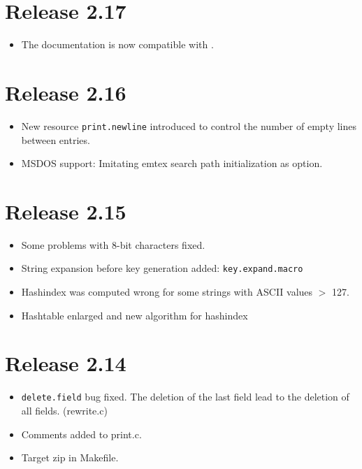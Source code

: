 \documentclass[11pt,a4paper]{scrartcl}
\newcommand\rsc[1]{\texttt{#1}}
\newcommand\File[1]{\textsf{#1}}
\newenvironment{Release}[2]{%
  \def\tmp{#2}%
  \section*{Release #1 \ifx\tmp\empty\else{\normalsize[#2]}\fi}
  \begin{itemize}
}{\end{itemize}}
\newenvironment{Fix}[1]{\item }{}
\newenvironment{New}[1]{\item }{}
\newenvironment{Doc}[1]{\item }{}
\newenvironment{Update}[1]{\item }{}
\begin{document}
\begin{multicols}
 \begin{Release}{2.17}{}
  \begin{Doc}{gene}
    The documentation is now compatible with \LaTeXe.
  \end{Doc}
 \end{Release}

 \begin{Release}{2.16}{}
  \begin{New}{gene}
    New resource \rsc{print.newline} introduced to control the
    number of empty lines between entries.
  \end{New}
  \begin{New}{gene}
    MSDOS support: Imitating emtex search path initialization as
    option.
  \end{New}
 \end{Release}

 \begin{Release}{2.15}{}
  \begin{Fix}{gene}
    Some problems with 8-bit characters fixed.
  \end{Fix}
  \begin{New}{gene}
    String expansion before key generation added:
    \rsc{key.expand.macro}
  \end{New}
  \begin{Fix}{gene}
    Hashindex was computed wrong for some strings with ASCII values $>$
    127.
  \end{Fix}
  \begin{Update}{gene}
    Hashtable enlarged and new algorithm for hashindex
  \end{Update}
 \end{Release}

 \begin{Release}{2.14}{}
  \begin{Fix}{gene}
    \rsc{delete.field} bug fixed. The deletion of the last
    field lead to the deletion of all fields. (\File{rewrite.c})
  \end{Fix}
  \begin{Update}{gene}
    Comments added to \File{print.c}.
  \end{Update}
  \begin{New}{gene}
    Target zip in \File{Makefile}.
  \end{New}
 \end{Release}


\end{multicols}
\end{document}
